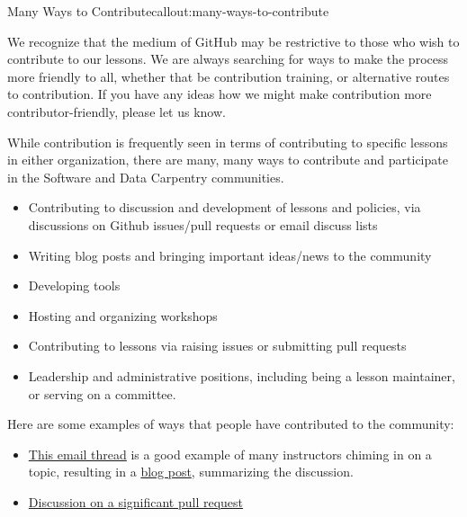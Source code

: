 \begin{callout}{Many Ways to Contribute}{callout:many-ways-to-contribute}

We recognize that the medium of GitHub may be restrictive to those who
wish to contribute to our lessons. We are always searching for ways to
make the process more friendly to all, whether that be contribution
training, or alternative routes to contribution. If you have any ideas
how we might make contribution more contributor-friendly, please let us
know.
\end{callout}


While contribution is frequently seen in terms of contributing to
specific lessons in either organization, there are many, many ways to
contribute and participate in the Software and Data Carpentry
communities.

\begin{itemize}
\item
  Contributing to discussion and development of lessons and policies,
  via discussions on Github issues/pull requests or email discuss lists
\item
  Writing blog posts and bringing important ideas/news to the community
\item
  Developing tools
\item
  Hosting and organizing workshops
\item
  Contributing to lessons via raising issues or submitting pull requests
\item
  Leadership and administrative positions, including being a lesson
  maintainer, or serving on a committee.
\end{itemize}

Here are some examples of ways that people have contributed to the
community:

\begin{itemize}
\item
  \href{http://lists.software-carpentry.org/pipermail/discuss/2015-October/003396.html}{This
  email thread} is a good example of many instructors chiming in on a
  topic, resulting in a
  \href{http://software-carpentry.org/blog/2015/10/pulling-along-those-behind.html}{blog
  post}, summarizing the discussion.
\item
  \href{https://github.com/swcarpentry/r-novice-gapminder/pull/89}{Discussion
  on a significant pull request}
\end{itemize}

